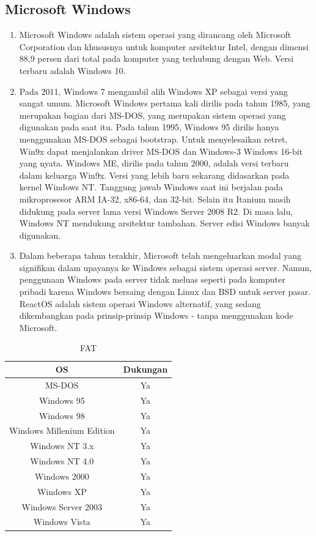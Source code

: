 \subsection{Microsoft Windows}
	\begin{enumerate}
		\item Microsoft Windows adalah sistem operasi yang dirancang oleh Microsoft Corporation dan khususnya untuk komputer arsitektur Intel, dengan dimensi 88,9 persen dari total pada komputer yang terhubung dengan Web. Versi terbaru adalah Windows 10.

		 \item Pada 2011, Windows 7 mengambil alih Windows XP sebagai versi yang sangat umum. Microsoft Windows pertama kali dirilis pada tahun 1985, yang merupakan bagian dari MS-DOS, yang merupakan sistem operasi yang digunakan pada saat itu. Pada tahun 1995, Windows 95 dirilis hanya menggunakan MS-DOS sebagai bootstrap. Untuk menyelesaikan retret, Win9x dapat menjalankan driver MS-DOS dan Windows-3 Windows 16-bit yang nyata. Windows ME, dirilis pada tahun 2000, adalah versi terbaru dalam keluarga Win9x. Versi yang lebih baru sekarang didasarkan pada kernel Windows NT. Tanggung jawab Windows saat ini berjalan pada mikroprosesor ARM IA-32, x86-64, dan 32-bit. Selain itu Itanium masih didukung pada server lama versi Windows Server 2008 R2. Di masa lalu, Windows NT mendukung arsitektur tambahan. Server edisi Windows banyak digunakan. 
		\item Dalam beberapa tahun terakhir, Microsoft telah mengeluarkan modal yang signifikan dalam upayanya ke Windows sebagai sistem operasi server. Namun, penggunaan Windows pada server tidak meluas seperti pada komputer pribadi karena Windows bersaing dengan Linux dan BSD untuk server pasar. ReactOS adalah sistem operasi Windows alternatif, yang sedang dikembangkan pada prinsip-prinsip Windows - tanpa menggunakan kode Microsoft.
	\end{enumerate}
	\begin{table}[h]
		\centering
		\caption{FAT}
		\label{FAT}
		\centering
			\begin{tabular}{|c|c|}
			\hline
			OS                        		& Dukungan \\
			\hline
			MS-DOS                    	& Ya       \\
			\hline
			Windows 95                	& Ya       \\
			\hline
			Windows 98                	& Ya       \\
			\hline
			Windows Millenium Edition & Ya       \\
			\hline
			Windows NT 3.x            	& Ya       \\
			\hline
			Windows NT 4.0            	& Ya       \\
			\hline
			Windows 2000              	& Ya       \\
			\hline
			Windows XP                	& Ya       \\
			\hline
			Windows Server 2003        & Ya       \\
			\hline
			Windows Vista  	           & Ya      \\
			\hline	
		\end{tabular}
		\end{table}



\cite{silberschatz2014operating}
\cite{hoare1974monitors}
\cite{bach1986design}
\cite{love2005linux}
\cite{kukreja2006rui}
\cite{mckeown2009software}
\cite{russinovich2005microsoft}
\cite{van1994treecon}
\cite{mckusick1985performance}
\cite{higgins1988clustal}
